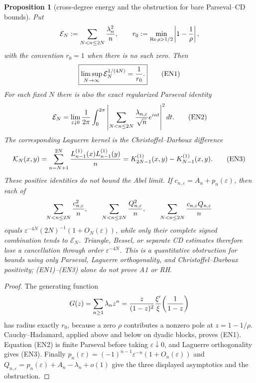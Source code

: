 \documentclass[11pt]{amsart}
\newtheorem{proposition}[theorem]{Proposition}
\theoremstyle{definition}
\theoremstyle{remark}
\theoremstyle{definition}
\renewcommand{\Re}{\operatorname{Re}}
\begin{document}
\begin{proposition}[cross-degree energy and the obstruction for bare Parseval--CD bounds]
\label{prop:cross-degree-energy-gate}
Put
\[
 \mathcal E_N:=\sum_{N<n\le2N}{\lambda_n^2\over n},
 \qquad
 r_0:=\min_{\Re\rho>1/2}\left|1-{1\over\rho}\right|,
\]
with the convention $r_0=1$ when there is no such zero.  Then
\[
 \boxed{\displaystyle
 \limsup_{N\to\infty}\mathcal E_N^{1/(4N)}={1\over r_0}.}               \tag{EN1}
\]
For each fixed $N$ there is also the exact regularized Parseval identity
\[
 \mathcal E_N=\lim_{\varepsilon\downarrow0}{1\over2\pi}
 \int_0^{2\pi}\left|
 \sum_{N<n\le2N}{\lambda_{n,\varepsilon}\over\sqrt n}e^{int}
 \right|^2dt.                                                           \tag{EN2}
\]
The corresponding Laguerre kernel is the Christoffel--Darboux difference
\[
 \mathcal K_N(x,y)=\sum_{n=N+1}^{2N}
 {L_{n-1}^{(1)}(x)L_{n-1}^{(1)}(y)\over n}
 =K_{2N-1}^{(1)}(x,y)-K_{N-1}^{(1)}(x,y).                               \tag{EN3}
\]
These positive identities do not bound the Abel limit.  If
$c_{n,\varepsilon}=A_n+p_n(\varepsilon)$, then each of
\[
 \sum_{N<n\le2N}{c_{n,\varepsilon}^2\over n},\qquad
 \sum_{N<n\le2N}{Q_{n,\varepsilon}^2\over n},\qquad
 \sum_{N<n\le2N}{c_{n,\varepsilon}Q_{n,\varepsilon}\over n}
\]
equals
$\varepsilon^{-4N}(2N)^{-1}(1+O_N(\varepsilon))$, while only their complete
signed combination tends to $\mathcal E_N$.  Triangle, Bessel, or separate
CD estimates therefore lose a cancellation through order
$\varepsilon^{-4N}$.  This is a quantitative obstruction for bounds using only Parseval,
Laguerre orthogonality, and Christoffel--Darboux positivity; (EN1)--(EN3)
alone do not prove A1 or RH.
\end{proposition}

\begin{proof}
The generating function
\[
 G(z)=\sum_{n\ge1}\lambda_nz^n
 ={z\over(1-z)^2}{\xi'\over\xi}\!\left({1\over1-z}\right)
\]
has radius exactly $r_0$, because a zero $\rho$ contributes a nonzero pole
at $z=1-1/\rho$.  Cauchy--Hadamard, applied above and below on dyadic
blocks, proves (EN1).  Equation (EN2) is finite Parseval before taking
$\varepsilon\downarrow0$, and Laguerre orthogonality gives (EN3).  Finally
$p_n(\varepsilon)=(-1)^{n-1}\varepsilon^{-n}(1+O_n(\varepsilon))$ and
$Q_{n,\varepsilon}=p_n(\varepsilon)+A_n-\lambda_n+o(1)$ give the three
displayed asymptotics and the obstruction.
\end{proof}
\end{document}
